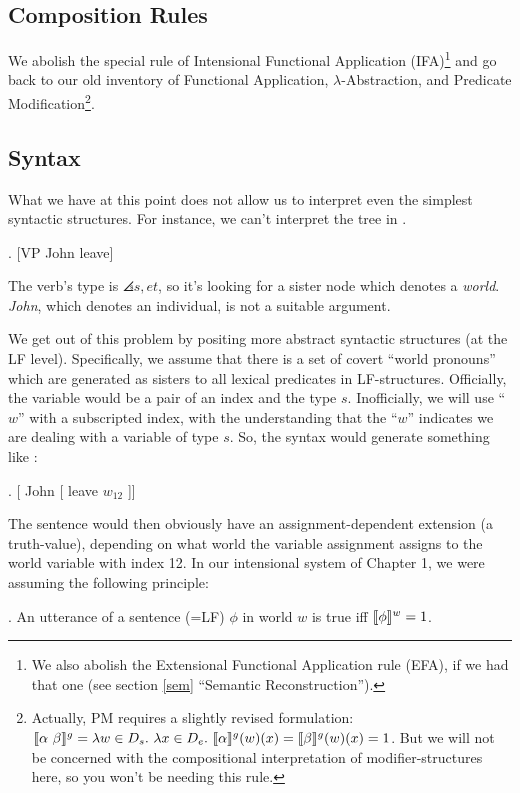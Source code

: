 \subsection{Composition Rules}

We abolish the special rule of Intensional Functional Application (IFA)\footnote{We also abolish the Extensional Functional Application rule (EFA), if we had that one (see section \ref{sem} ``Semantic Reconstruction'').} and go back to our old inventory of Functional Application, $\lambda$-Abstraction, and Predicate Modification\footnote{Actually, PM requires a slightly revised formulation: $\sv{\alpha\ \beta}^g = \lambda w\in D_{s}.\ \lambda x\in D_{e}.\ \sv{\alpha}^g(w)(x) = \sv{\beta}^g(w)(x) = 1$. But we will not be concerned with the compositional interpretation of modifier-structures here, so you won't be needing this rule.}.

\subsection{Syntax}

What we have at this point does not allow us to interpret even the simplest syntactic structures. For instance, we can't interpret the tree in \Next.

\exi. [VP John leave]

The verb's type is $\angles{s,et}$, so it's looking for a sister node which denotes a \emph{world}. \emph{John}, which denotes an individual, is not a suitable argument.

We get out of this problem by positing more abstract syntactic structures (at the LF level). Specifically, we assume that there is a set of covert ``world pronouns'' which are generated as sisters to all lexical predicates in LF-structures. Officially, the variable would be a pair of an index and the type $s$. Inofficially, we will use ``$w$'' with a subscripted index, with the understanding that the ``$w$'' indicates we are dealing with a variable of type $s$. So, the syntax would generate something like \Next:

\ex. [ John [ leave $w_{12}$ ]]

The sentence would then obviously have an assignment-dependent extension (a truth-value), depending on what world the variable assignment assigns to the world variable with index 12. In our intensional system of Chapter 1, we were assuming the following principle:

\ex. An utterance of a sentence (=LF) $\phi$ in world $w$ is true iff $\llbracket \phi \rrbracket^w = 1$.

